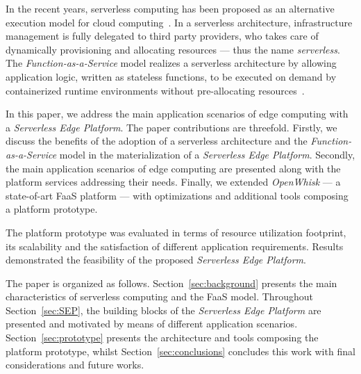 
In the recent years, serverless computing has been proposed as an alternative execution model for cloud computing~\cite{Lloyd18serverless}. In a serverless architecture, infrastructure management is fully delegated to third party providers, who takes care of dynamically provisioning and allocating resources --- thus the name \textit{serverless}. The \textit{Function-as-a-Service} model realizes a serverless architecture by allowing application logic, written as stateless functions, to be executed on demand by containerized runtime environments without pre-allocating resources~\cite{Roberts:2018}. 

In this paper, we address the main application scenarios of edge computing with a \textit{Serverless Edge Platform}. The paper contributions are threefold. Firstly, we discuss the benefits of the adoption of a serverless architecture and the \textit{Function-as-a-Service} model in the materialization of a \textit{Serverless Edge Platform}. Secondly, the main application scenarios of edge computing are presented along with 
the platform services addressing their needs. Finally, we extended \textit{OpenWhisk} --- a state-of-art FaaS platform --- with optimizations and additional tools composing a platform prototype. 

The platform prototype was evaluated in terms of resource utilization footprint, its scalability and the satisfaction of different application requirements. Results demonstrated the feasibility of the proposed \textit{Serverless Edge Platform}.


The paper is organized as follows. Section~\ref{sec:background} presents the main characteristics of serverless computing and the FaaS model.
Throughout Section~\ref{sec:SEP}, the building blocks of the \textit{Serverless Edge Platform} are presented and motivated by means of different application scenarios. Section~\ref{sec:prototype} presents the architecture and tools composing the platform prototype, whilst %
Section~\ref{sec:conclusions} concludes this work with final considerations and future works.


